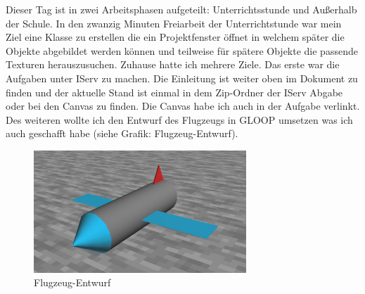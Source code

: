 \documentclass[a4paper, 10pt, oneside]{article} %
\begin{document}
\begin{normalsize}
\begin{spacing}{1}

Dieser Tag ist in zwei Arbeitsphasen aufgeteilt: Unterrichtsstunde und Außerhalb der Schule. In den zwanzig Minuten Freiarbeit der Unterrichtstunde war mein Ziel eine Klasse zu erstellen die ein Projektfenster öffnet in welchem später die Objekte abgebildet werden können und teilweise für spätere Objekte die passende Texturen herauszusuchen. Zuhause hatte ich mehrere Ziele. Das erste war die Aufgaben unter IServ zu machen. Die Einleitung ist weiter oben im Dokument zu finden und der aktuelle Stand ist einmal in dem Zip-Ordner der IServ Abgabe oder bei den Canvas zu finden. Die Canvas habe ich auch in der Aufgabe verlinkt. Des weiteren wollte ich den Entwurf des Flugzeugs in GLOOP umsetzen was ich auch geschafft habe (siehe Grafik: Flugzeug-Entwurf).

\begin{figure}[h]
\centering
\includegraphics[width=8cm]{Bilder/Screenshots/ScreenshotFlugzeug1.png}
\caption{Flugzeug-Entwurf}
\end{figure}


\end{spacing}
\end{normalsize}
\end{document}
